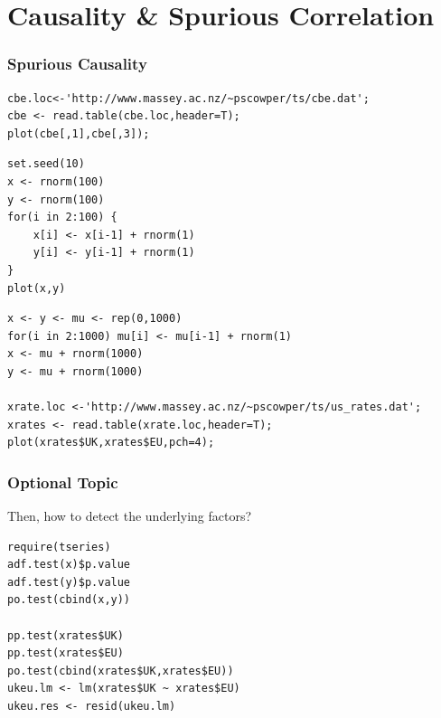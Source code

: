 \documentclass[hyperref={colorlinks=false},handout,10pt]{beamer}
\begin{document}
\section{Causality \& Spurious Correlation}

\begin{frame}
    \frametitle{Spurious Causality}

    \begin{lstlisting}
cbe.loc<-'http://www.massey.ac.nz/~pscowper/ts/cbe.dat';
cbe <- read.table(cbe.loc,header=T);
plot(cbe[,1],cbe[,3]);
    \end{lstlisting}

    \begin{lstlisting}
set.seed(10)
x <- rnorm(100)
y <- rnorm(100)
for(i in 2:100) {
    x[i] <- x[i-1] + rnorm(1)
    y[i] <- y[i-1] + rnorm(1)
}
plot(x,y)
    \end{lstlisting}

    \begin{lstlisting}
x <- y <- mu <- rep(0,1000)
for(i in 2:1000) mu[i] <- mu[i-1] + rnorm(1)
x <- mu + rnorm(1000)
y <- mu + rnorm(1000)

xrate.loc <-'http://www.massey.ac.nz/~pscowper/ts/us_rates.dat';
xrates <- read.table(xrate.loc,header=T);
plot(xrates$UK,xrates$EU,pch=4);
    \end{lstlisting}

\end{frame}

\begin{frame}[fragile]
    \frametitle{Optional Topic}
    Then, how to detect the underlying factors? 
    \begin{lstlisting}
require(tseries)
adf.test(x)$p.value
adf.test(y)$p.value
po.test(cbind(x,y))

pp.test(xrates$UK)
pp.test(xrates$EU)
po.test(cbind(xrates$UK,xrates$EU))
ukeu.lm <- lm(xrates$UK ~ xrates$EU)
ukeu.res <- resid(ukeu.lm)
    \end{lstlisting}
\end{frame}
\end{document}
